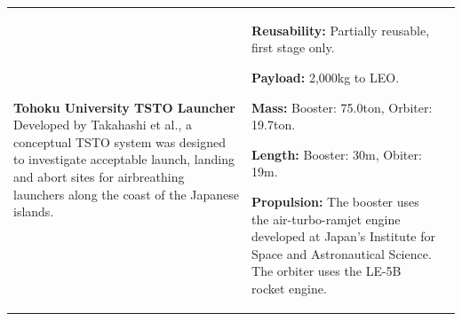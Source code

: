 {\begin{landscape}
\begin{xltabular}{\linewidth}{|X|X|X|}
	\\
	\hline \small 
	\textbf{Tohoku University TSTO Launcher}\cite{Takahashi1997}\newline\newline
	Developed by Takahashi et al.\cite{Takahashi1997}, a conceptual TSTO system was designed to investigate acceptable launch, landing and abort sites for airbreathing launchers along the coast of the Japanese islands. 
	&\small
	
	\textbf{Reusability:} Partially reusable, first stage only. 
	
	\textbf{Payload:} 2,000kg to LEO. 
	
	\textbf{Mass:} Booster: 75.0ton, Orbiter: 19.7ton.
	
	\textbf{Length:} Booster: 30m,  Obiter: 19m.
	
	\textbf{Propulsion:} The booster uses the air-turbo-ramjet engine developed at Japan's Institute for Space and Astronautical Science. The orbiter uses the LE-5B rocket engine. 
	

\end{xltabular}
\end{landscape}}
